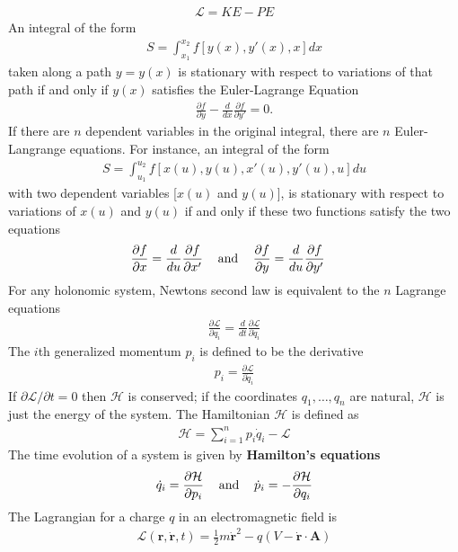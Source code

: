 \begin{multicols}{2}
\begin{align}
\mathcal{L}=KE-PE
\end{align}
An integral of the form
\begin{align}
S=\int_{x_1}^{x_2}f[y(x),y'(x),x]dx
\end{align}
taken along a path $y=y(x)$ is stationary with respect to variations of that path if and only if $y(x)$ satisfies the Euler-Lagrange Equation
\begin{align}
\frac{\partial f}{\partial y}-\frac{d}{dx}\frac{\partial f}{\partial y'}=0.
\end{align}
If there are $n$ dependent variables in the original integral, there are $n$ Euler-Langrange equations. For instance, an integral of the form
\begin{align}
S=\int_{u_1}^{u_2}f[x(u),y(u),x'(u),y'(u),u]du
\end{align}
with two dependent variables [$x(u)$ and $y(u)$], is stationary with respect to variations of $x(u)$ and $y(u)$ if and only if these two functions satisfy the two equations
\begin{align}
\frac{\partial f}{\partial x}&=\frac{d}{du}\frac{\partial f}{\partial x'} \hspace{0.3cm}\textrm{ and }\hspace{0.3cm} \frac{\partial f}{\partial y}=\frac{d}{du}\frac{\partial f}{\partial y'}
\end{align}
For any holonomic system, Newtons second law is equivalent to the $n$ Lagrange equations
\begin{align}
\frac{\partial \mathcal{L}}{\partial q_i}=\frac{d}{dt}\frac{\partial \mathcal{L}}{\partial \dot{q}_i}
\end{align}
The $i$th generalized momentum $p_i$ is defined to be the derivative
\begin{align}
p_i=\frac{\partial \mathcal{L}}{\partial \dot{q}_i}
\end{align}
If $\partial \mathcal{L}/\partial t=0$ then $\mathcal{H}$ is conserved; if the coordinates $q_1,\dots,q_n$ are natural, $\mathcal{H}$ is just the energy of the system. The Hamiltonian $\mathcal{H}$ is defined as
\begin{align}
\mathcal{H}=\sum_{i=1}^{n}p_i\dot{q}_i-\mathcal{L}
\end{align}
The time evolution of a system is given by \textbf{Hamilton's equations}
\begin{align}
\dot{q}_i=\frac{\partial \mathcal{H}}{\partial p_i} \hspace{0.3cm}\textrm{ and }\hspace{0.3cm}\dot{p}_i=-\frac{\partial \mathcal{H}}{\partial q_i}
\end{align}
The Lagrangian for a charge $q$ in an electromagnetic field is
\begin{align}
\mathcal{L}(\boldsymbol{r}, \dot{\boldsymbol{r}}, t)=\frac{1}{2}m\dot{\boldsymbol{r}}^2-q(V-\dot{\boldsymbol{r}}\cdot\boldsymbol{A})
\end{align}
\end{multicols}
